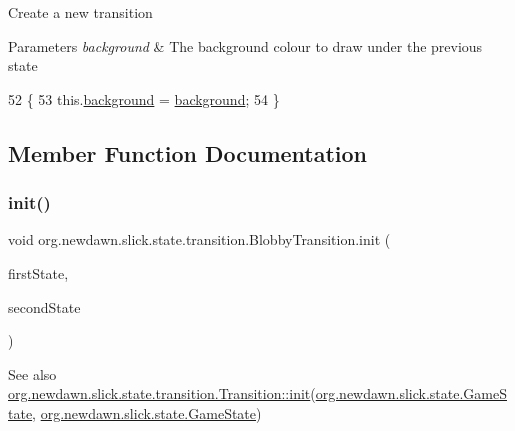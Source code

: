 Create a new transition


\begin{DoxyParams}{Parameters}
{\em background} & The background colour to draw under the previous state \\
\hline
\end{DoxyParams}

\begin{DoxyCode}
52                                               \{
53         this.\mbox{\hyperlink{classorg_1_1newdawn_1_1slick_1_1state_1_1transition_1_1_blobby_transition_a53b1caa1a2eccd2cbb1a5d46b3f2c95b}{background}} = \mbox{\hyperlink{classorg_1_1newdawn_1_1slick_1_1state_1_1transition_1_1_blobby_transition_a53b1caa1a2eccd2cbb1a5d46b3f2c95b}{background}};
54     \}
\end{DoxyCode}


\subsection{Member Function Documentation}
\mbox{\label{classorg_1_1newdawn_1_1slick_1_1state_1_1transition_1_1_blobby_transition_ac28ad95ee1406c3969f3962189e07e26}} 
\subsubsection{\texorpdfstring{init()}{init()}}
{\footnotesize\ttfamily void org.\+newdawn.\+slick.\+state.\+transition.\+Blobby\+Transition.\+init (\begin{DoxyParamCaption}\item[{\mbox{\hyperlink{interfaceorg_1_1newdawn_1_1slick_1_1state_1_1_game_state}{Game\+State}}}]{first\+State,  }\item[{\mbox{\hyperlink{interfaceorg_1_1newdawn_1_1slick_1_1state_1_1_game_state}{Game\+State}}}]{second\+State }\end{DoxyParamCaption})\hspace{0.3cm}{\ttfamily [inline]}}

\begin{DoxySeeAlso}{See also}
\mbox{\hyperlink{interfaceorg_1_1newdawn_1_1slick_1_1state_1_1transition_1_1_transition_a7b59f0c9205f1f0417ee18bc526e5b01}{org.\+newdawn.\+slick.\+state.\+transition.\+Transition\+::init}}(\mbox{\hyperlink{interfaceorg_1_1newdawn_1_1slick_1_1state_1_1_game_state}{org.\+newdawn.\+slick.\+state.\+Game\+State}}, \mbox{\hyperlink{interfaceorg_1_1newdawn_1_1slick_1_1state_1_1_game_state}{org.\+newdawn.\+slick.\+state.\+Game\+State}}) 
\end{DoxySeeAlso}


